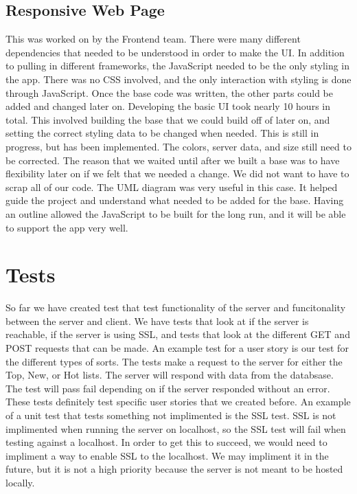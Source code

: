 \documentclass[12pt]{article}
\begin{document}
      \subsection{Responsive Web Page}
      This was worked on by the Frontend team. There were many different dependencies that needed to be understood in order to make the UI. In addition to pulling in different frameworks, the JavaScript needed to be the only styling in the app. There was no CSS involved, and the only interaction with styling is done through JavaScript. Once the base code was written, the other parts could be added and changed later on. Developing the basic UI took nearly 10 hours in total. This involved building the base that we could build off of later on, and setting the correct styling data to be changed when needed. This is still in progress, but has been implemented. The colors, server data, and size still need to be corrected. The reason that we waited until after we built a base was to have flexibility later on if we felt that we needed a change. We did not want to have to scrap all of our code. The UML diagram was very useful in this case. It helped guide the project and understand what needed to be added for the base. Having an outline allowed the JavaScript to be built for the long run, and it will be able to support the app very well.

\section{Tests}

So far we have created test that test functionality of the server and funcitonality between the server and client.  We have tests that look at if the server is reachable, if the server is using SSL, and tests that look at the different GET and POST requests that can be made.  An example test for a user story is our test for the different types of sorts.  The tests make a request to the server for either the Top, New, or Hot lists.  The server will respond with data from the databsase.  The test will pass fail depending on if the server responded without an error.  These tests definitely test specific user stories that we created before.  An example of a unit test that tests something not implimented is the SSL test.  SSL is not implimented when running the server on localhost, so the SSL test will fail when testing against a localhost.  In order to get this to succeed, we would need to impliment a way to enable SSL to the localhost.  We may impliment it in the future, but it is not a high priority because the server is not meant to be hosted locally.
\end{document}
